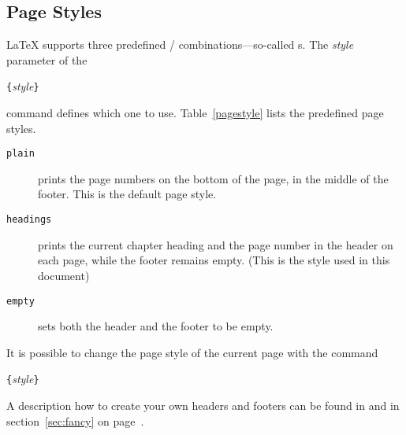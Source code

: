 \clearpage
%
%
%

\subsection{Page Styles}
 
\LaTeX{} supports three predefined /
combinations---so-called s. The \emph{style} parameter
of the 
\begin{command}
\verb|{|\emph{style}\verb|}|
\end{command}
\noindent command defines which one to use. 
Table~\ref{pagestyle}
lists the predefined page styles.

\begin{table}[!hbp]
\caption{The Predefined Page Styles of \LaTeX.} \label{pagestyle}
\begin{lined}{12cm}
\begin{description}

\item[\normalfont\texttt{plain}] prints the page numbers on the bottom
  of the page, in the middle of the footer. This is the default page
  style.

\item[\normalfont\texttt{headings}] prints the current chapter heading
  and the page number in the header on each page, while the footer
  remains empty.  (This is the style used in this document)
\item[\normalfont\texttt{empty}] sets both the header and the footer
  to be empty.

\end{description}
\end{lined}
\end{table}

It is possible to change the page style of the current page
with the command
\begin{command}
\verb|{|\emph{style}\verb|}|
\end{command}
A description how to create your own
headers and footers can be found in \companion{} and in section~\ref{sec:fancy} on page~\pageref{sec:fancy}.
%
%


%

